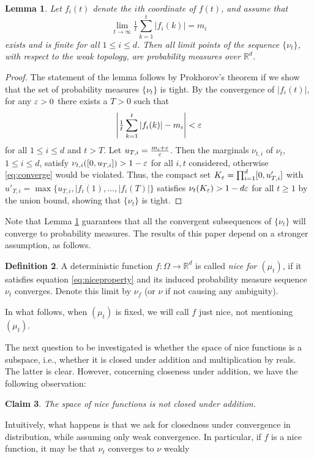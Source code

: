 \documentclass[english]{article} %
\newcommand{\real}{\mathbb{R}}
\newcounter{assumption}%
\newtheorem{lemma}{Lemma}[section]
\newtheorem{claim}[lemma]{Claim}
\theoremstyle{definition}
\newtheorem{definition}[lemma]{Definition}
\begin{document}
\begin{lemma}
\label{lem:nicefunction}
Let $f_i(t)$ denote the $i$th coordinate of $f(t)$, and assume that
\begin{equation}
\label{eq:niceproperty}
\lim_{t\to\infty} \tfrac{1}{t}\sum_{k=1}^t |f_i(k)|=m_i
\end{equation}
exists and is finite for all $1 \le i \le d$.
Then all limit points of the sequence $\{\nu_t\}$, with respect to the weak topology, are probability measures over $\real^d$.
\end{lemma}
\begin{proof}
The statement of the lemma follows by Prokhorov's theorem if we show that the set of probability measures $\{\nu_t\}$ is tight.
By the convergence of $|f_i(t)|$, for any $\varepsilon>0$ there exists a $T>0$ such that
\begin{equation}
\label{eq:converge}
\left| \tfrac{1}{t} \sum_{k=1}^t |f_i(k)| - m_i \right| <\varepsilon
\end{equation}
for all $1 \le i \le d$ and $t>T$. Let $u_{T,i}=\tfrac{m_i+\varepsilon}{\varepsilon}$. Then the marginals
$\nu_{t,i}$ of $\nu_t$, $1\le i \le d$, satisfy $\nu_{t,i}([0,u_{T,i}]) > 1-\varepsilon$ for all $i,t$ considered, otherwise \eqref{eq:converge} would be violated. Thus, the compact set
$K_{\varepsilon}=\prod_{i=1}^d [0,u'_{T,i}]$ with $u'_{T,i}=\max\{u_{T,i},|f_i(1),\ldots,|f_i(T)|\}$ satisfies
$\nu_t(K_{\varepsilon})>1-d \varepsilon$ for all $t \ge 1$ by the union bound, showing that $\{\nu_t\}$ is tight.
\end{proof}
\fi
Note that Lemma \ref{lem:nicefunction} guarantees that all the convergent subsequences of $\{\nu_t\}$ will converge to probability measures. The results of this paper depend on a stronger assumption, as follows.

\begin{definition}
A deterministic function $f:\Omega \rightarrow \real^d$ is called \emph{nice for $(\mu_t)$},
if it satisfies equation \eqref{eq:niceproperty} and its induced probability measure sequence $\nu_t$ converges. 
Denote this limit by $\nu_f$ (or $\nu$ if not causing any ambiguity). 
\end{definition}
In what follows, when $(\mu_t)$ is fixed, we will call $f$ just nice, not mentioning $(\mu_t)$.

The next question to be investigated is whether the space of nice functions is a subspace, i.e., whether it is closed under addition and multiplication by reals. The latter is clear. However, concerning closeness under addition, we have 
the following observation:
\begin{claim}
The space of nice functions is not closed under addition.
\end{claim}
Intuitively, what happens is that we ask for closedness under convergence in distribution, while assuming only weak convergence. In particular, if $f$ is a nice function, it may be that $\nu_t$ converges to $\nu$ weakly
\end{document}
